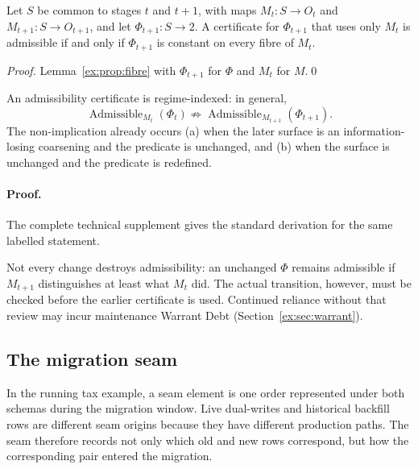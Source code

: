 \documentclass[twocolumn,envcountsect,envcountsame,natbib]{svjour3}
\begin{document}
\begin{corollary}\label{ex:cor:dynfibre}
Let $S$ be common to stages $t$ and $t+1$, with maps $M_t:S\to O_t$ and $M_{t+1}:S\to O_{t+1}$, and let $\Phi_{t+1}:S\to 2$. A certificate for $\Phi_{t+1}$ that uses only $M_t$ is admissible if and only if $\Phi_{t+1}$ is constant on every fibre of $M_t$.
\end{corollary}

\begin{proof}
Lemma~\ref{ex:prop:fibre} with $\Phi_{t+1}$ for $\Phi$ and $M_t$ for $M$.\qed
\end{proof}

\begin{proposition}\label{ex:prop:certificate-expiry}
An admissibility certificate is regime-indexed: in general,
\[
\operatorname{Admissible}_{M_t}(\Phi_t)
\not\Longrightarrow
\operatorname{Admissible}_{M_{t+1}}(\Phi_{t+1}).
\]
The non-implication already occurs (a) when the later surface is an information-losing coarsening and the predicate is unchanged, and (b) when the surface is unchanged and the predicate is redefined.
\end{proposition}

\paragraph{Proof.} The complete technical supplement gives the standard derivation for the same labelled statement.

Not every change destroys admissibility: an unchanged $\Phi$ remains admissible if $M_{t+1}$ distinguishes at least what $M_t$ did. The actual transition, however, must be checked before the earlier certificate is used. Continued reliance without that review may incur maintenance Warrant Debt (Section~\ref{ex:sec:warrant}).

\subsection{The migration seam}\label{ex:sec:migration-seam}

In the running tax example, a seam element is one order represented under both schemas during the migration window. Live dual-writes and historical backfill rows are different seam origins because they have different production paths. The seam therefore records not only which old and new rows correspond, but how the corresponding pair entered the migration.
\end{document}
